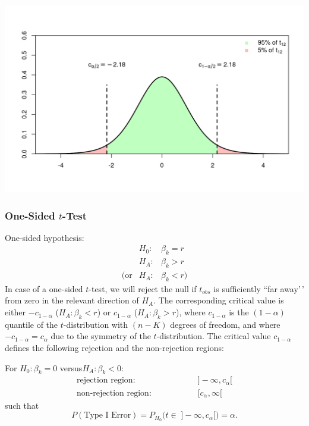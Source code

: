 \documentclass[
  14pt,
]{memoir}
\begin{document}
\begin{center}\includegraphics[width=1\textwidth]{figure/minimal-unnamed-chunk-67-1} \end{center}

\hypertarget{one-sided-t-test}{%
\subsubsection*{\texorpdfstring{One-Sided \(t\)-Test}{One-Sided t-Test}}\label{one-sided-t-test}}

One-sided hypothesis:
\begin{equation*}
\begin{array}{lll}
&H_0: & \beta_k =r\\
&H_A: & \beta_k >r\\
(\text{or}&H_A: & \beta_k< r)
\end{array}
\end{equation*}
In case of a one-sided \(t\)-test, we will reject the null if \(t_{obs}\) is sufficiently ``far away'\,' from zero in the relevant direction of \(H_A\). The corresponding critical value is either \(-c_{1-\alpha}\) (\(H_A:\beta_k< r\)) or \(c_{1-\alpha}\) (\(H_A:\beta_k> r\)), where \(c_{1-\alpha}\) is the \((1-\alpha)\) quantile of the \(t\)-distribution with \((n-K)\) degrees of freedom, and where \(-c_{1-\alpha}=c_{\alpha}\) due to the symmetry of the \(t\)-distribution. The critical value \(c_{1-\alpha}\) defines the following rejection and the non-rejection regions:

\bigskip

\noindent For \(H_0: \beta_k=0\) \quad versus\quad \(H_A: \beta_k < 0\):
\begin{align*}
\text{rejection region:}   &\hspace{2cm}]-\infty,c_{\alpha}[ \\
\text{non-rejection region:}&\hspace{2cm}[c_{\alpha},\infty[
\end{align*}
such that
\[
P(\text{Type I Error})=P_{H_0}\Big(t\in\;]-\infty,c_{\alpha}[\Big)=\alpha.
\]
\end{document}
